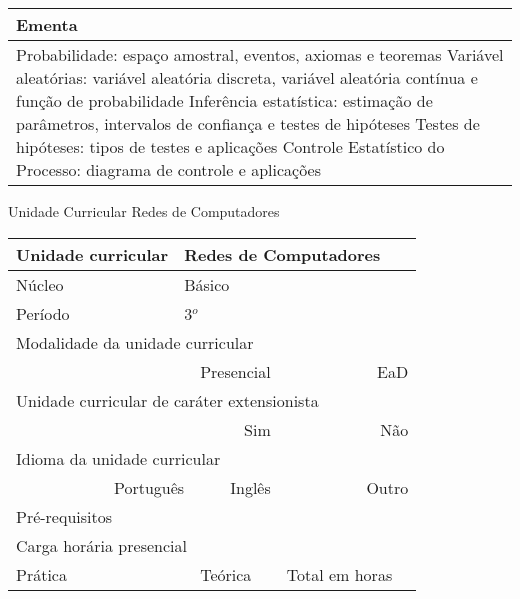 \begin{quadro}[ht!]
\begin{tabular}{|p{3cm} p{2cm} p{3cm} p{2cm} p{3cm} p{2cm}|}
\multicolumn{6}{|p{15cm}|}{\cellcolor{blue1} Ementa} \\\hline
\hline\multicolumn{6}{|p{15cm}|}{\scriptsize Probabilidade: espaço amostral, eventos, axiomas e teoremas Variável aleatórias: variável aleatória discreta, variável aleatória contínua e função de probabilidade Inferência estatística: estimação de parâmetros, intervalos de confiança e testes de hipóteses Testes de hipóteses: tipos de testes e aplicações Controle Estatístico do Processo: diagrama de controle e aplicações}\\\hline 
\hline
	\end{tabular}
\end{quadro}


\begin{quadro}[ht!]
  \centering\scriptsize
\caption{Unidade Curricular Redes de Computadores}
\begin{tabular}{|p{3cm} p{2cm} p{3cm} p{2cm} p{3cm} p{2cm}|}\hline
\multicolumn{1}{|p{3cm}|}{\cellcolor{blue1} Unidade curricular} & \multicolumn{5}{p{9cm}|}{Redes de Computadores}\\\hline
\multicolumn{1}{|p{3cm}|}{\cellcolor{blue1} Núcleo} & \multicolumn{5}{p{11.5cm}|}{Básico}\\\hline
\multicolumn{1}{|p{3cm}|}{\cellcolor{blue1} Período} & \multicolumn{5}{p{9cm}|}{3$^o$}\\\hline
\multicolumn{6}{|p{15cm}|}{\cellcolor{blue1} Modalidade da unidade curricular} \\\hline
\multicolumn{2}{|r}{		} &  \multicolumn{2}{r}{Presencial \XBox} & \multicolumn{2}{r|}{EaD \Square	} \\\hline
\multicolumn{6}{|p{15cm}|}{\cellcolor{blue1} Unidade curricular de caráter extensionista} \\\hline
\multicolumn{4}{|r}{			Sim \XBox	} & \multicolumn{2}{r|}{	Não \Square	}\\\hline
\multicolumn{6}{|p{15cm}|}{\cellcolor{blue1} Idioma da unidade curricular} \\ \hline
\multicolumn{2}{|r}{	Português \XBox	} &  \multicolumn{2}{r}{	Inglês \Square	} & \multicolumn{2}{r|}{	Outro \Square	} \\ \hline
\multicolumn{1}{|p{3cm}|}{\cellcolor{blue1} Pré-requisitos} & \multicolumn{5}{p{9cm}|}{}\\ \hline
\multicolumn{6}{|p{15cm}|}{\cellcolor{blue1} Carga horária presencial} \\ \hline
\multicolumn{1}{|p{3cm}|}{\raggedleft Prática} & \multicolumn{1}{p{1cm}|}{\centering	30	} &  \multicolumn{1}{p{3cm}|}{\raggedleft Teórica}  & \multicolumn{1}{p{1cm}|}{\centering 	30	} & \multicolumn{1}{p{3cm}|}{\raggedleft Total em horas} & \multicolumn{1}{p{1cm}|}{\raggedleft	60	} \\ \hline 

\end{tabular}
\end{quadro}

